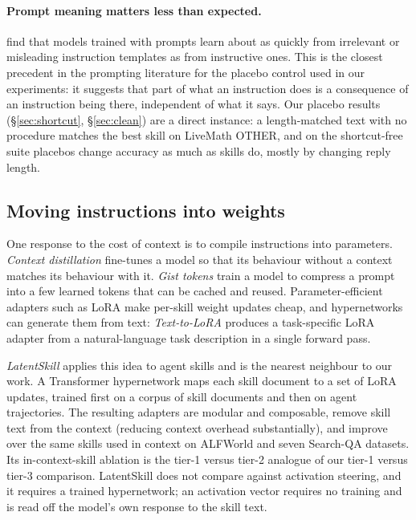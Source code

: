 \documentclass[11pt]{article}
\begin{document}
\paragraph{Prompt meaning matters less than expected.} \citet{webson2022prompts} find that models
trained with prompts learn about as quickly from irrelevant or misleading instruction templates as
from instructive ones. This is the closest precedent in the prompting literature for the placebo
control used in our experiments: it suggests that part of what an instruction does is a consequence
of an instruction being there, independent of what it says. Our placebo results
(\S\ref{sec:shortcut}, \S\ref{sec:clean}) are a direct instance: a length-matched text with no
procedure matches the best skill on LiveMath OTHER, and on the shortcut-free suite placebos change
accuracy as much as skills do, mostly by changing reply length.

\subsection{Moving instructions into weights}

One response to the cost of context is to compile instructions into parameters. \emph{Context
distillation} \citep{snell2022distilling} fine-tunes a model so that its behaviour without a context
matches its behaviour with it. \emph{Gist tokens} \citep{mu2023gist} train a model to compress a
prompt into a few learned tokens that can be cached and reused. Parameter-efficient adapters such as
LoRA \citep{hu2022lora} make per-skill weight updates cheap, and hypernetworks can generate them from
text: \emph{Text-to-LoRA} \citep{charakorn2025t2l} produces a task-specific LoRA adapter from a
natural-language task description in a single forward pass.

\emph{LatentSkill} \citep{yu2026latentskill} applies this idea to agent skills and is the nearest
neighbour to our work. A Transformer hypernetwork maps each skill document to a set of LoRA updates,
trained first on a corpus of skill documents and then on agent trajectories. The resulting adapters
are modular and composable, remove skill text from the context (reducing context overhead
substantially), and improve over the same skills used in context on ALFWorld and seven Search-QA
datasets. Its in-context-skill ablation is the tier-1 versus tier-2 analogue of our tier-1 versus
tier-3 comparison. LatentSkill does not compare against activation steering, and it requires a
trained hypernetwork; an activation vector requires no training and is read off the model's own
response to the skill text.
\end{document}
